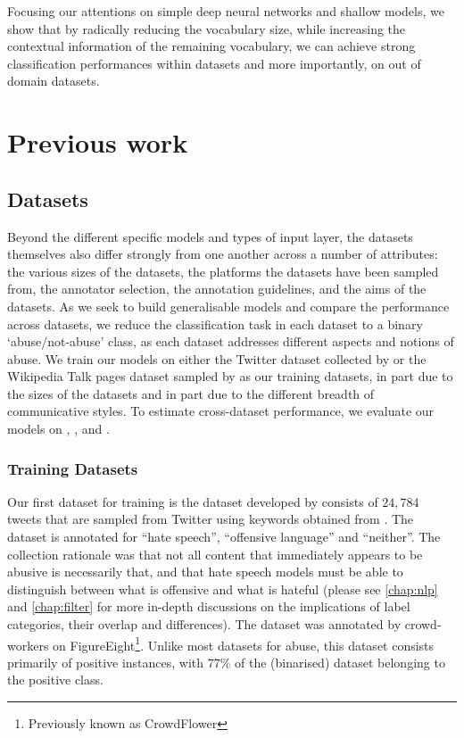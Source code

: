 Focusing our attentions on simple deep neural networks and shallow models, we show that by radically reducing the vocabulary size, while increasing the contextual information of the remaining vocabulary, we can achieve strong classification performances within datasets and more importantly, on out of domain datasets.

\section{Previous work}




\subsection{Datasets}
Beyond the different specific models and types of input layer, the datasets themselves also differ strongly from one another across a number of attributes: the various sizes of the datasets, the platforms the datasets have been sampled from, the annotator selection, the annotation guidelines, and the aims of the datasets. As we seek to build generalisable models and compare the performance across datasets, we reduce the classification task in each dataset to a binary `abuse/not-abuse' class, as each dataset addresses different aspects and notions of abuse.
We train our models on either the Twitter dataset collected by \citet{Davidson:2017} or the Wikipedia Talk pages dataset sampled by \citet{Wulczyn:2017} as our training datasets, in part due to the sizes of the datasets and in part due to the different breadth of communicative styles. To estimate cross-dataset performance, we evaluate our models on \citet{Waseem-Hovy:2016}, \citet{Waseem:2016}, and \citet{Garcia:2019}.


\subsubsection{Training Datasets}
Our first dataset for training is the dataset developed by \citet{Davidson:2017} consists of $24,784$ tweets that are sampled from Twitter using keywords obtained from \citet{Hatebase}. The dataset is annotated for ``hate speech'', ``offensive language'' and ``neither''. The collection rationale was that not all content that immediately appears to be abusive is necessarily that, and that hate speech models must be able to distinguish between what is offensive and what is hateful \cite{Davidson:2017} (please see \autoref{chap:nlp} and \autoref{chap:filter} for more in-depth discussions on the implications of label categories, their overlap and differences). The dataset was annotated by crowd-workers on FigureEight\footnote{Previously known as CrowdFlower}. Unlike most datasets for abuse, this dataset consists primarily of positive instances, with $77$\% of the (binarised) dataset belonging to the positive class.

